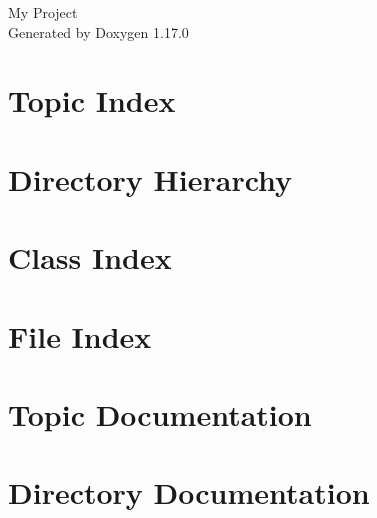 \documentclass[twoside]{book}
\newcommand{\+}{\discretionary{\mbox{\scriptsize$\hookleftarrow$}}{}{}}
\newcommand{\clearemptydoublepage}{%
    \newpage{\pagestyle{empty}\cleardoublepage}%
  }
\begin{document}
  \raggedbottom
    \hypersetup{pageanchor=false,
                bookmarksnumbered=true,
                pdfencoding=unicode
               }
  \begin{titlepage}
  \vspace*{7cm}
  \begin{center}%
  {\Large My Project}\\
  \vspace*{1cm}
  {\large Generated by Doxygen 1.17.0}\\
  \end{center}
  \end{titlepage}
  \clearemptydoublepage
  \tableofcontents
  \clearemptydoublepage
  \hypersetup{pageanchor=true}


\chapter{Topic Index}

\chapter{Directory Hierarchy}

\chapter{Class Index}

\chapter{File Index}

\chapter{Topic Documentation}





\chapter{Directory Documentation}





\end{document}
